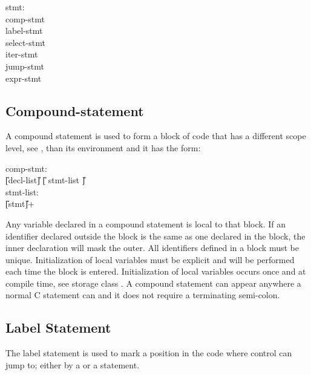 \begin{production}
\bp
{
stmt:\\
\>      comp-stmt\\
\>      label-stmt\\
\>      select-stmt\\
\>      iter-stmt\\
\>      jump-stmt\\
\>      expr-stmt\\
}
\end{production}

\subsection{Compound-statement}
\label{sec:CompoundStatement}

A compound statement is used to form a block of code that
has a different scope level, see , than its
environment and it has the form:

\begin{production}
\bp
{
comp-stmt:\\
\>      \T{\{} \U{[}decl-list\U{]} \U{[} stmt-list \U{]}\T{\}}\\
stmt-list:\\
\>      \U{[}stmt\U{]}+ 
}
\end{production}

Any variable declared in a compound statement is local to that
block. If an identifier declared outside the block is the same as one
declared in the block, the inner declaration will mask the outer. All
identifiers defined in a block must be unique.  Initialization of
local variables must be explicit and will be performed each time the
block is entered. Initialization of local  variables occurs
once and at compile time, see storage class
. A compound statement can appear anywhere 
a normal C statement can and it does not require a terminating
semi-colon.



\subsection{Label Statement}
\label{sec:LabelStatement}

The label statement is used to mark a position in the code where
control can jump to; either by a  or a
 statement.

